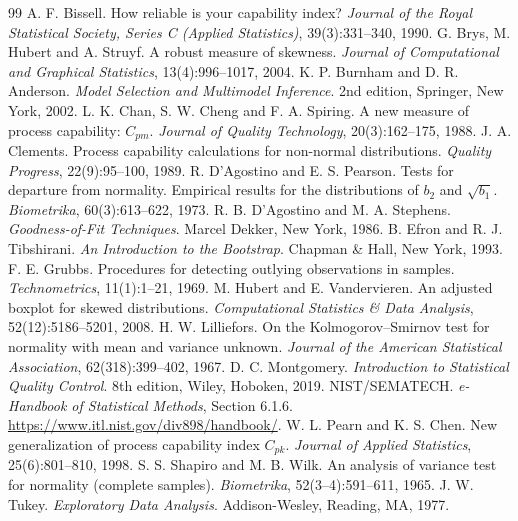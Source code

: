\documentclass[a4paper,11pt,oneside,openany,parskip=half-,headings=standardclasses,toc=flat,numbers=noenddot]{scrbook}
\begin{document}
\begin{thebibliography}{99}
 A. F. Bissell. How reliable is your capability index? \emph{Journal of the Royal Statistical
  Society, Series C (Applied Statistics)}, 39(3):331--340, 1990.
 G. Brys, M. Hubert and A. Struyf. A robust measure of skewness. \emph{Journal of Computational
  and Graphical Statistics}, 13(4):996--1017, 2004.
 K. P. Burnham and D. R. Anderson. \emph{Model Selection and Multimodel Inference}. 2nd edition,
  Springer, New York, 2002.
 L. K. Chan, S. W. Cheng and F. A. Spiring. A new measure of process capability: $C_{pm}$.
  \emph{Journal of Quality Technology}, 20(3):162--175, 1988.
 J. A. Clements. Process capability calculations for non-normal distributions.
  \emph{Quality Progress}, 22(9):95--100, 1989.
 R. D'Agostino and E. S. Pearson. Tests for departure from normality. Empirical results
  for the distributions of $b_2$ and $\sqrt{b_1}$. \emph{Biometrika}, 60(3):613--622, 1973.
 R. B. D'Agostino and M. A. Stephens. \emph{Goodness-of-Fit Techniques}. Marcel Dekker,
  New York, 1986.
 B. Efron and R. J. Tibshirani. \emph{An Introduction to the Bootstrap}. Chapman \& Hall, New York, 1993.
 F. E. Grubbs. Procedures for detecting outlying observations in samples. \emph{Technometrics},
  11(1):1--21, 1969.
 M. Hubert and E. Vandervieren. An adjusted boxplot for skewed distributions.
  \emph{Computational Statistics \& Data Analysis}, 52(12):5186--5201, 2008.
 H. W. Lilliefors. On the Kolmogorov--Smirnov test for normality with mean and variance unknown.
  \emph{Journal of the American Statistical Association}, 62(318):399--402, 1967.
 D. C. Montgomery. \emph{Introduction to Statistical Quality Control}. 8th edition, Wiley,
  Hoboken, 2019.
 NIST/SEMATECH. \emph{e-Handbook of Statistical Methods}, Section 6.1.6.
  \url{https://www.itl.nist.gov/div898/handbook/}.
 W. L. Pearn and K. S. Chen. New generalization of process capability index $C_{pk}$.
  \emph{Journal of Applied Statistics}, 25(6):801--810, 1998.
 S. S. Shapiro and M. B. Wilk. An analysis of variance test for normality (complete samples).
  \emph{Biometrika}, 52(3--4):591--611, 1965.
 J. W. Tukey. \emph{Exploratory Data Analysis}. Addison-Wesley, Reading, MA, 1977.
\end{thebibliography}
\end{document}
